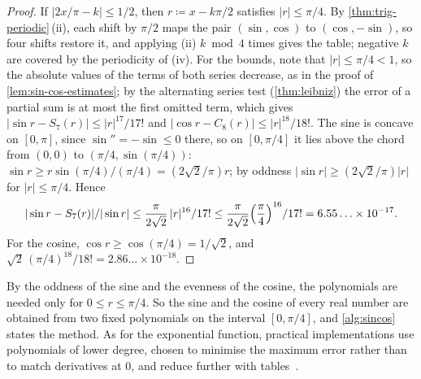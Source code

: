\begin{proof}
If $|2x/\pi-k|\le1/2$, then $r\coloneqq x-k\pi/2$ satisfies $|r|\le\pi/4$. By \cref{thm:trig-periodic}\,(ii), each shift by $\pi/2$ maps the pair $(\sin,\cos)$ to $(\cos,-\sin)$, so four shifts restore it, and applying (ii) $k\bmod4$ times gives the table; negative $k$ are covered by the periodicity of (iv). For the bounds, note that $|r|\le\pi/4<1$, so the absolute values of the terms of both series decrease, as in the proof of \cref{lem:sin-cos-estimates}; by the alternating series test (\cref{thm:leibniz}) the error of a partial sum is at most the first omitted term, which gives $|\sin r-S_7(r)|\le|r|^{17}/17!$ and $|\cos r-C_8(r)|\le|r|^{18}/18!$. The sine is concave on $[0,\pi]$, since $\sin''=-\sin\le0$ there, so on $[0,\pi/4]$ it lies above the chord from $(0,0)$ to $(\pi/4,\sin(\pi/4))$: $\sin r\ge r\sin(\pi/4)/(\pi/4)=(2\sqrt2/\pi) r$; by oddness $|\sin r|\ge(2\sqrt2/\pi)|r|$ for $|r|\le\pi/4$. Hence
\[
|\sin r-S_7(r)|/|\sin r|\le\frac\pi{2\sqrt2}\,|r|^{16}/17!\le\frac\pi{2\sqrt2}\Bigl(\frac\pi4\Bigr)^{16}/17!=6.55\ldots\times10^{-17}.
\]
For the cosine, $\cos r\ge\cos(\pi/4)=1/\sqrt2$, and $\sqrt2\,(\pi/4)^{18}/18!=2.86\ldots\times10^{-18}$.
\end{proof}

\begin{table}
\end{table}

By the oddness of the sine and the evenness of the cosine, the polynomials are needed only for $0\le r\le\pi/4$. So the sine and the cosine of every real number are obtained from two fixed polynomials on the interval $[0,\pi/4]$, and \cref{alg:sincos} states the method. As for the exponential function, practical implementations use polynomials of lower degree, chosen to minimise the maximum error rather than to match derivatives at $0$, and reduce further with tables~\cite{muller2016elementary}.

